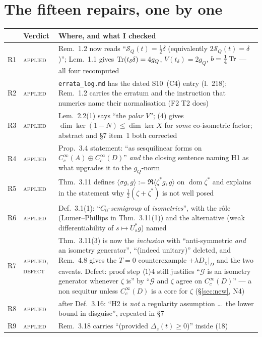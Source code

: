 \documentclass[11pt]{article}
\newcommand{\SLD}{\mathcal S_Q}
\begin{document}
\section{The fifteen repairs, one by one}\label{sec:repairs}
\newcommand{\vA}{\textsc{applied}}
\newcommand{\vAd}{\textsc{applied, defect}}
\newcommand{\vN}{\textsc{not applied}}
{\small\begin{tabular}{@{}llp{9.5cm}@{}}
\hline
 & Verdict & Where, and what I checked\\ \hline
R1 & \vA & Rem.~1.2 now reads ``$\SLD(t)=\frac12\delta$ (equivalently $2\SLD(t)=\delta$)'';
 Lem.~1.1 gives $\operatorname{Tr}(t_\delta\delta)=4g_Q$, $V(t_\delta)=2g_Q$, $b=\frac14\operatorname{Tr}$ --- all four
 recomputed\\
R2 & \vA & \texttt{errata\_log.md} has the dated S10~(C4) entry (l.~218); Rem.~1.2 carries
 the erratum and the instruction that numerics name their normalisation (F2 T2 does)\\
R3 & \vA & Lem.~2.2(1) says ``the \emph{polar} $V$''; (4) gives
 $\dim\ker(1-N)\le\dim\ker X$ for \emph{some} co-isometric factor; abstract and \S7 item~1
 both corrected\\
R4 & \vA & Prop.~3.4 statement: ``as sesquilinear forms on $C_c^\infty(A)\oplus C_c^\infty(D)$''
 \emph{and} the closing sentence naming H1 as what upgrades it to the $g_Q$-norm\\
R5 & \vA & Thm.~3.11 defines $\langle\sigma g,g\rangle:=\Re\langle\zeta^*g,g\rangle$ on
 $\operatorname{dom}\zeta^*$ and explains in the statement why $\frac12(\zeta+\zeta^*)$ is
 not well posed\\
R6 & \vA & Def.~3.1(1): ``$C_0$-\emph{semigroup} of \emph{isometries}'', with the r\^ole
 (Lumer--Phillips in Thm.~3.11(1)) and the alternative (weak differentiability of
 $s\mapsto U_s^*g$) named\\
R7 & \vAd & Thm.~3.11(3) is now the \emph{inclusion} with ``anti-symmetric \emph{and} an
 isometry generator'', ``(indeed unitary)'' deleted, and Rem.~4.8 gives the $T=0$
 counterexample $+\lambda D_\chi|_D$ and the two caveats.  Defect: proof step
 $\langle1\rangle4$ still justifies ``$\mathcal G$ is an isometry generator whenever
 $\zeta$ is'' by ``$\mathcal G$ and $\zeta$ agree on $C_c^\infty(D)$'' --- a non sequitur
 unless $C_c^\infty(D)$ is a core for $\zeta$ (\S\ref{sec:new}, N4)\\
R8 & \vA & after Def.~3.16: ``H2 is \emph{not} a regularity assumption \dots\ the lower
 bound in disguise'', repeated in \S7\\
R9 & \vA & Rem.~3.18 carries ``(provided $\Delta_z(t)\ge0$)'' inside (18)\\

\end{tabular}}
\end{document}
